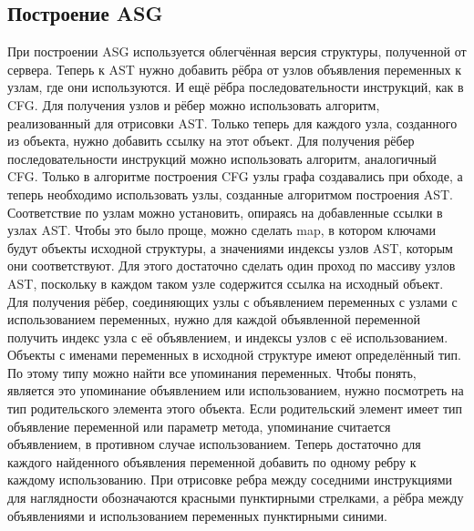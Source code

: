 \subsection{Построение ASG} \label{ch2:subsec-title-abbr}
При построении ASG используется облегчённая версия структуры, полученной от сервера. Теперь к AST нужно добавить рёбра от узлов объявления переменных к узлам, где они используются. И ещё рёбра последовательности инструкций, как в CFG.
Для получения узлов и рёбер можно использовать алгоритм, реализованный для отрисовки AST. Только теперь для каждого узла, созданного из объекта, нужно добавить ссылку на этот объект.
Для получения рёбер последовательности инструкций можно использовать алгоритм, аналогичный CFG. Только в алгоритме построения CFG узлы графа создавались при обходе, а теперь необходимо использовать узлы, созданные алгоритмом построения AST. Соответствие по узлам можно установить, опираясь на добавленные ссылки в узлах AST. Чтобы это было проще, можно сделать map, в котором ключами будут объекты исходной структуры, а значениями индексы узлов AST, которым они соответствуют. Для этого достаточно сделать один проход по массиву узлов AST, поскольку в каждом таком узле содержится ссылка на исходный объект.
Для получения рёбер, соединяющих узлы с объявлением переменных с узлами с использованием переменных, нужно для каждой объявленной переменной получить индекс узла с её объявлением, и индексы узлов с её использованием. Объекты с именами переменных в исходной структуре имеют определённый тип. По этому типу можно найти все упоминания переменных. Чтобы понять, является это упоминание объявлением или использованием, нужно посмотреть на тип родительского элемента этого объекта. Если родительский элемент имеет тип объявление переменной или параметр метода, упоминание считается объявлением, в противном случае использованием. Теперь достаточно для каждого найденного объявления переменной добавить по одному ребру к каждому использованию.
При отрисовке ребра между соседними инструкциями для наглядности обозначаются красными пунктирными стрелками, а рёбра между объявлениями и использованием переменных пунктирными синими.
